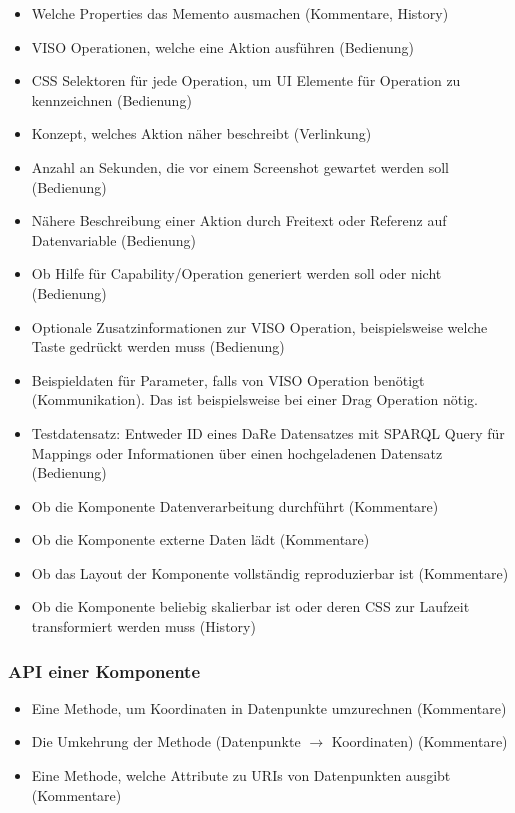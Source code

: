 \documentclass[
	headsepline,
	footsepline,
	fontsize=12pt,
	bibliography=totoc
]{scrbook}
\begin{document}
\begin{itemize}
	\item Welche Properties das Memento ausmachen (Kommentare, History)
	\item VISO Operationen, welche eine Aktion ausführen (Bedienung)
	\item CSS Selektoren für jede Operation, um UI Elemente für Operation zu kennzeichnen (Bedienung)
	\item Konzept, welches Aktion näher beschreibt (Verlinkung)
	\item Anzahl an Sekunden, die vor einem Screenshot gewartet werden soll (Bedienung)
	\item Nähere Beschreibung einer Aktion durch Freitext oder Referenz auf Datenvariable (Bedienung)
	\item Ob Hilfe für Capability/Operation generiert werden soll oder nicht (Bedienung)
	\item Optionale Zusatzinformationen zur VISO Operation, beispielsweise welche Taste gedrückt werden muss (Bedienung)
	\item Beispieldaten für Parameter, falls von VISO Operation benötigt (Kommunikation). Das ist beispielsweise bei einer Drag Operation nötig.
	\item Testdatensatz: Entweder ID eines DaRe Datensatzes mit SPARQL Query für Mappings oder Informationen über einen hochgeladenen Datensatz (Bedienung)
	\item Ob die Komponente Datenverarbeitung durchführt (Kommentare)
	\item Ob die Komponente externe Daten lädt (Kommentare)
	\item Ob das Layout der Komponente vollständig reproduzierbar ist (Kommentare)
	\item Ob die Komponente beliebig skalierbar ist oder deren CSS zur Laufzeit transformiert werden muss (History)
\end{itemize}

\subsubsection{API einer Komponente}

\begin{itemize}
	\item Eine Methode, um Koordinaten in Datenpunkte umzurechnen (Kommentare)
	\item Die Umkehrung der Methode (Datenpunkte $\to$ Koordinaten) (Kommentare)
	\item Eine Methode, welche Attribute zu URIs von Datenpunkten ausgibt (Kommentare)
\end{itemize}
\end{document}
